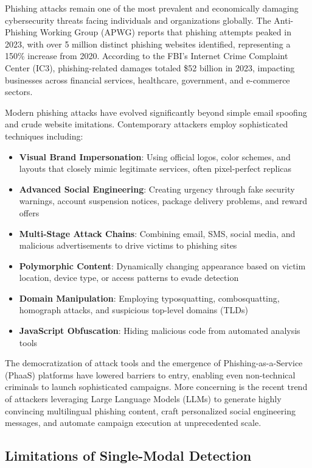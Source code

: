 \documentclass[conference]{IEEEtran}
\begin{document}
Phishing attacks remain one of the most prevalent and economically damaging cybersecurity threats facing individuals and organizations globally. The Anti-Phishing Working Group (APWG) reports that phishing attempts peaked in 2023, with over 5 million distinct phishing websites identified, representing a 150\% increase from 2020. According to the FBI's Internet Crime Complaint Center (IC3), phishing-related damages totaled \$52 billion in 2023, impacting businesses across financial services, healthcare, government, and e-commerce sectors.

Modern phishing attacks have evolved significantly beyond simple email spoofing and crude website imitations. Contemporary attackers employ sophisticated techniques including:

\begin{itemize}
\item \textbf{Visual Brand Impersonation}: Using official logos, color schemes, and layouts that closely mimic legitimate services, often pixel-perfect replicas
\item \textbf{Advanced Social Engineering}: Creating urgency through fake security warnings, account suspension notices, package delivery problems, and reward offers
\item \textbf{Multi-Stage Attack Chains}: Combining email, SMS, social media, and malicious advertisements to drive victims to phishing sites
\item \textbf{Polymorphic Content}: Dynamically changing appearance based on victim location, device type, or access patterns to evade detection
\item \textbf{Domain Manipulation}: Employing typosquatting, combosquatting, homograph attacks, and suspicious top-level domains (TLDs)
\item \textbf{JavaScript Obfuscation}: Hiding malicious code from automated analysis tools
\end{itemize}

The democratization of attack tools and the emergence of Phishing-as-a-Service (PhaaS) platforms have lowered barriers to entry, enabling even non-technical criminals to launch sophisticated campaigns. More concerning is the recent trend of attackers leveraging Large Language Models (LLMs) to generate highly convincing multilingual phishing content, craft personalized social engineering messages, and automate campaign execution at unprecedented scale.


\subsection{Limitations of Single-Modal Detection}
\end{document}
